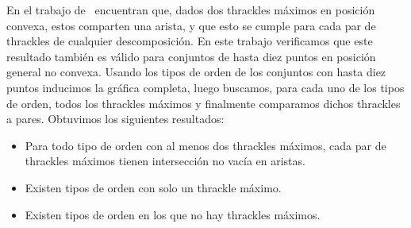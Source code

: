   En el trabajo de~\cite{Fabila-Monroy2018} encuentran que, dados dos thrackles
  máximos en posición convexa, estos comparten una arista, y que esto se cumple
  para cada par de thrackles de cualquier descomposición. En este trabajo verificamos
  que este resultado también es válido para conjuntos de hasta diez puntos en
  posición general no convexa. Usando los tipos de orden de los conjuntos
  con hasta diez puntos inducimos la gráfica completa, luego buscamos, para
  cada uno de los tipos de orden, todos los thrackles máximos y
  finalmente comparamos dichos thrackles a pares. Obtuvimos los siguientes resultados:
  \begin{itemize}
    \item Para todo tipo de orden con al menos dos thrackles máximos, cada par de thrackles máximos tienen intersección no vacía en aristas.
    \item Existen tipos de orden con solo un thrackle máximo.
    \item Existen tipos de orden en los que no hay thrackles máximos.
  \end{itemize}

